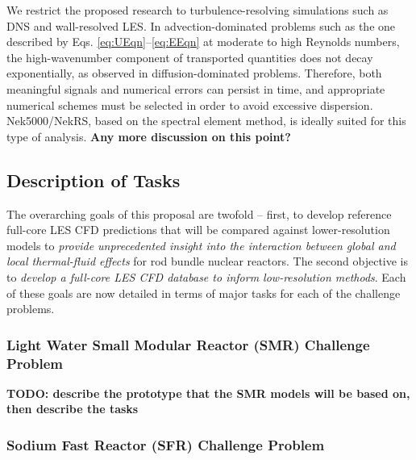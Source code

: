 We restrict the proposed research to turbulence-resolving simulations such as DNS and
wall-resolved LES. In advection-dominated problems such as the
one described by Eqs. \ref{eq:UEqn}--\ref{eq:EEqn} at moderate to high Reynolds numbers,
the high-wavenumber component of transported quantities does not decay
exponentially, as observed in diffusion-dominated problems. Therefore, both
meaningful signals and numerical errors can persist in time, and appropriate
numerical schemes must be selected in order to avoid excessive dispersion.
Nek5000/NekRS, based on the spectral element method, is ideally suited for this
type of analysis. {\bf Any more discussion on this point?}

\vspace{-.25in}
\subsection{Description of Tasks}
\label{sec:tasks}
\vspace{-.2in}


The overarching goals of this proposal are twofold -- first, to develop
reference full-core LES CFD predictions that will be compared against
lower-resolution models to {\it provide unprecedented insight into the interaction
between global and local thermal-fluid effects} for rod bundle nuclear reactors. The second
objective is to {\it develop a full-core LES CFD database to inform low-resolution methods}. Each of these
goals are now detailed in terms of major tasks for each of the challenge
problems.

\vspace{-.25in}
\subsubsection{Light Water Small Modular Reactor (SMR) Challenge Problem}
\vspace{-.2in}
{\bf TODO: describe the prototype that the SMR models will be based on, then
describe the tasks}

\vspace{-.25in}
\subsubsection{Sodium Fast Reactor (SFR) Challenge Problem}
\vspace{-.2in}

